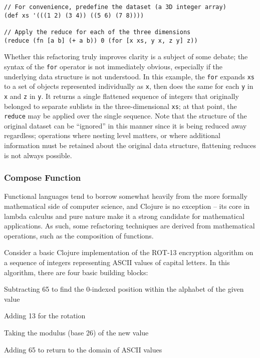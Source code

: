 \begin{verbatim}
// For convenience, predefine the dataset (a 3D integer array)
(def xs '(((1 2) (3 4)) ((5 6) (7 8))))

// Apply the reduce for each of the three dimensions
(reduce (fn [a b] (+ a b)) 0 (for [x xs, y x, z y] z))
\end{verbatim}

Whether this refactoring truly improves clarity is a subject of some debate; the syntax of the \verb!for! operator is not immediately obvious, especially if the underlying data structure is not understood. In this example, the \verb!for! expands \verb!xs! to a set of objects represented individually as \verb!x!, then does the same for each \verb!y! in \verb!x! and \verb!z! in \verb!y!. It returns a single flattened sequence of integers that originally belonged to separate sublists in the three-dimensional \verb!xs!; at that point, the \verb!reduce! may be applied over the single sequence. Note that the structure of the original dataset can be ``ignored'' in this manner since it is being reduced away regardless; operations where nesting level matters, or where additional information must be retained about the original data structure, flattening reduces is not always possible.

\subsubsection{Compose Function}

Functional languages tend to borrow somewhat heavily from the more formally mathematical side of computer science, and Clojure is no exception -- its core in lambda calculus and pure nature make it a strong candidate for mathematical applications. As such, some refactoring techniques are derived from mathematical operations, such as the composition of functions.

Consider a basic Clojure implementation of the ROT-13 encryption algorithm on a sequence of integers representing ASCII values of capital letters. In this algorithm, there are four basic building blocks:

\begin{itemize*}
\item Subtracting 65 to find the 0-indexed position within the alphabet of the given value
\item Adding 13 for the rotation
\item Taking the modulus (base 26) of the new value
\item Adding 65 to return to the domain of ASCII values
\end{itemize*}

